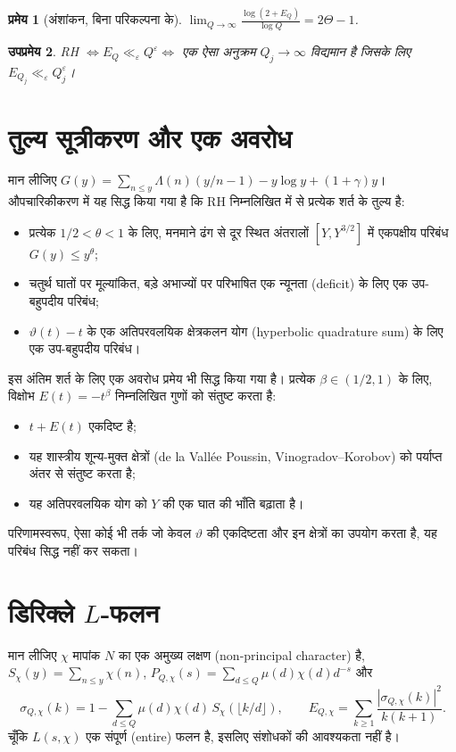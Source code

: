\documentclass[11pt,a4paper]{amsart}
\newtheorem{teorema}{प्रमेय}
\newtheorem{corolario}[teorema]{उपप्रमेय}
\theoremstyle{definition}
\theoremstyle{remark}
\begin{document}
\begin{teorema}[अंशांकन, बिना परिकल्पना के]\label{teo:calibracion}
$\displaystyle\lim_{Q\to\infty}\frac{\log(2+E_Q)}{\log Q}=2\Theta-1$.
\end{teorema}

\begin{corolario}
RH $\iff E_Q\ll_\varepsilon Q^\varepsilon\iff$ एक ऐसा अनुक्रम $Q_j\to\infty$ विद्यमान है जिसके लिए $E_{Q_j}\ll_\varepsilon Q_j^\varepsilon$।
\end{corolario}

\section{तुल्य सूत्रीकरण और एक अवरोध}\label{sec:equiv}

मान लीजिए $G(y)=\sum_{n\le y}\Lambda(n)(y/n-1)-y\log y+(1+\gamma)y$। औपचारिकीकरण में यह सिद्ध किया गया है कि RH निम्नलिखित में से प्रत्येक शर्त के तुल्य है:
\begin{itemize}
\item प्रत्येक $1/2<\theta<1$ के लिए, मनमाने ढंग से दूर स्थित अंतरालों $[Y,Y^{3/2}]$ में एकपक्षीय परिबंध $G(y)\le y^\theta$;
\item चतुर्थ घातों पर मूल्यांकित, बड़े अभाज्यों पर परिभाषित एक न्यूनता (deficit) के लिए एक उप-बहुपदीय परिबंध;
\item $\vartheta(t)-t$ के एक अतिपरवलयिक क्षेत्रकलन योग (hyperbolic quadrature sum) के लिए एक उप-बहुपदीय परिबंध।
\end{itemize}
इस अंतिम शर्त के लिए एक अवरोध प्रमेय भी सिद्ध किया गया है। प्रत्येक $\beta\in(1/2,1)$ के लिए, विक्षोभ $E(t)=-t^\beta$ निम्नलिखित गुणों को संतुष्ट करता है:
\begin{itemize}
\item $t+E(t)$ एकदिष्ट है;
\item यह शास्त्रीय शून्य-मुक्त क्षेत्रों (de la Vallée Poussin, Vinogradov--Korobov) को पर्याप्त अंतर से संतुष्ट करता है;
\item यह अतिपरवलयिक योग को $Y$ की एक घात की भाँति बढ़ाता है।
\end{itemize}
परिणामस्वरूप, ऐसा कोई भी तर्क जो केवल $\vartheta$ की एकदिष्टता और इन क्षेत्रों का उपयोग करता है, यह परिबंध सिद्ध नहीं कर सकता।

\section{डिरिक्ले \texorpdfstring{$L$}{L}-फलन}\label{sec:dirichlet}

मान लीजिए $\chi$ मापांक $N$ का एक अमुख्य लक्षण (non-principal character) है, $S_\chi(y)=\sum_{n\le y}\chi(n)$, $P_{Q,\chi}(s)=\sum_{d\le Q}\mu(d)\chi(d)d^{-s}$ और
\[
\sigma_{Q,\chi}(k)=1-\sum_{d\le Q}\mu(d)\chi(d)\,S_\chi(\lfloor k/d\rfloor),\qquad
E_{Q,\chi}=\sum_{k\ge1}\frac{|\sigma_{Q,\chi}(k)|^2}{k(k+1)}.
\]
चूँकि $L(s,\chi)$ एक संपूर्ण (entire) फलन है, इसलिए संशोधकों की आवश्यकता नहीं है।
\end{document}
